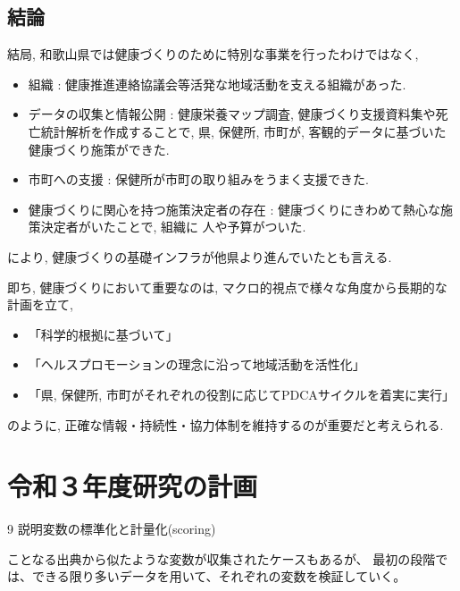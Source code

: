 \section{結論}
結局, 和歌山県では健康づくりのために特別な事業を行ったわけではなく,
\begin{itemize} \setlength{\itemsep}{-0.5mm} \setlength{\parskip}{-0.5mm}
	\item 組織 :  健康推進連絡協議会等活発な地域活動を支える組織があった.
	\item データの収集と情報公開 : 健康栄養マップ調査, 健康づくり支援資料集や死亡統計解析を作成することで, 県, 保健所, 市町が, 客観的データに基づいた健康づくり施策ができた.
	\item 市町への支援 : 保健所が市町の取り組みをうまく支援できた.
	\item 健康づくりに関心を持つ施策決定者の存在 : 健康づくりにきわめて熱心な施策決定者がいたことで, 組織に 人や予算がついた.
\end{itemize}
により, 健康づくりの基礎インフラが他県より進んでいたとも言える.

即ち, 健康づくりにおいて重要なのは, マクロ的視点で様々な角度から長期的な計画を立て,
\begin{itemize} \setlength{\itemsep}{-0.5mm} \setlength{\parskip}{-0.5mm}
	\item 「科学的根拠に基づいて」
	\item 「ヘルスプロモーションの理念に沿って地域活動を活性化」
	\item 「県, 保健所, 市町がそれぞれの役割に応じてPDCAサイクルを着実に実行」
\end{itemize}
のように, 正確な情報・持続性・協力体制を維持するのが重要だと考えられる.




\chapter{令和３年度研究の計画}





9 説明変数の標準化と計量化(scoring)



ことなる出典から似たような変数が収集されたケースもあるが、
最初の段階では、できる限り多いデータを用いて、それぞれの変数を検証していく。

